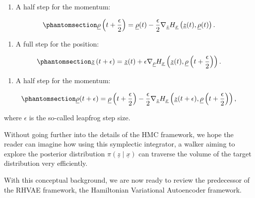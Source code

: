 \documentclass[
]{scrartcl}
\providecommand{\tightlist}{%
  \setlength{\itemsep}{0pt}\setlength{\parskip}{0pt}}
\begin{document}
\begin{refsection}
\begin{enumerate}
\def\labelenumi{\arabic{enumi}.}
\tightlist
\item
  A half step for the momentum:
\end{enumerate}

\begin{equation}\phantomsection\label{eq-leapfrog-half-step}{
\underline{\rho}\left(t + \frac{\epsilon}{2}\right) = 
\underline{\rho}(t) - 
\frac{\epsilon}{2} \nabla_{\underline{z}} H_{\underline{x}}\left(
    \underline{z}(t), \underline{\rho}(t)
\right).
}\end{equation}

\begin{enumerate}
\def\labelenumi{\arabic{enumi}.}
\setcounter{enumi}{1}
\tightlist
\item
  A full step for the position:
\end{enumerate}

\begin{equation}\phantomsection\label{eq-leapfrog-full-step}{
\underline{z}\left(t + \epsilon\right) = 
\underline{z}(t) + 
\epsilon \nabla_{\underline{\rho}} H_{\underline{x}}\left(
    \underline{z}(t), \underline{\rho}\left(t + \frac{\epsilon}{2}\right)
\right).
}\end{equation}

\begin{enumerate}
\def\labelenumi{\arabic{enumi}.}
\setcounter{enumi}{2}
\tightlist
\item
  A half step for the momentum:
\end{enumerate}

\begin{equation}\phantomsection\label{eq-leapfrog-half-step-2}{
\underline{\rho}(t + \epsilon) = 
\underline{\rho}\left(t + \frac{\epsilon}{2}\right) - 
\frac{\epsilon}{2} \nabla_{\underline{z}} H_{\underline{x}}\left(
    \underline{z}(t + \epsilon), \underline{\rho}\left(t + \frac{\epsilon}{2}\right)
\right),
}\end{equation}

where \(\epsilon\) is the so-called leapfrog step size.

Without going further into the details of the HMC framework, we hope the
reader can imagine how using this symplectic integrator, a walker aiming
to explore the posterior distribution
\(π(\underline{z} \mid \underline{x})\) can traverse the volume of the
target distribution very efficiently.

With this conceptual background, we are now ready to review the
predecessor of the RHVAE framework, the Hamiltonian Variational
Autoencoder framework.


\end{refsection}
\end{document}
